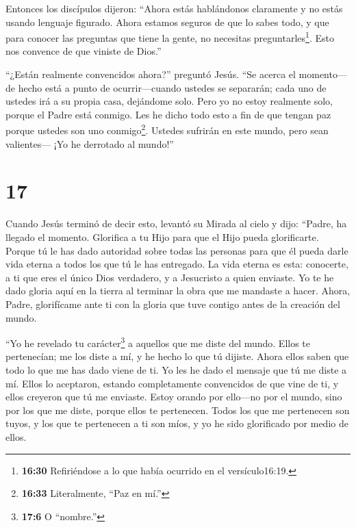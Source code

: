  Entonces los discípulos dijeron: ``Ahora estás hablándonos
claramente y no estás usando lenguaje figurado.  Ahora
estamos seguros de que lo sabes todo, y que para conocer las preguntas
que tiene la gente, no necesitas preguntarles\footnote{\textbf{16:30}
  Refiriéndose a lo que había ocurrido en el versículo16:19.}. Esto nos
convence de que viniste de Dios.''

 ``¿Están realmente convencidos ahora?'' preguntó Jesús.
 ``Se acerca el momento---de hecho está a punto de
ocurrir---cuando ustedes se separarán; cada uno de ustedes irá a su
propia casa, dejándome solo. Pero yo no estoy realmente solo, porque el
Padre está conmigo.  Les he dicho todo esto a fin de que
tengan paz porque ustedes son uno conmigo\footnote{\textbf{16:33}
  Literalmente, ``Paz en mí.''}. Ustedes sufrirán en este mundo, pero
sean valientes--- ¡Yo he derrotado al mundo!''

\hypertarget{section-16}{%
\section{17}\label{section-16}}

 Cuando Jesús terminó de decir esto, levantó su Mirada al
cielo y dijo: ``Padre, ha llegado el momento. Glorifica a tu Hijo para
que el Hijo pueda glorificarte.  Porque tú le has dado
autoridad sobre todas las personas para que él pueda darle vida eterna a
todos los que tú le has entregado.  La vida eterna es esta:
conocerte, a ti que eres el único Dios verdadero, y a Jesucristo a quien
enviaste.  Yo te he dado gloria aquí en la tierra al
terminar la obra que me mandaste a hacer.  Ahora, Padre,
glorifícame ante ti con la gloria que tuve contigo antes de la creación
del mundo.

 ``Yo he revelado tu carácter\footnote{\textbf{17:6} O
  ``nombre.''} a aquellos que me diste del mundo. Ellos te pertenecían;
me los diste a mí, y he hecho lo que tú dijiste.  Ahora
ellos saben que todo lo que me has dado viene de ti.  Yo les
he dado el mensaje que tú me diste a mí. Ellos lo aceptaron, estando
completamente convencidos de que vine de ti, y ellos creyeron que tú me
enviaste.  Estoy orando por ello---no por el mundo, sino por
los que me diste, porque ellos te pertenecen.  Todos los
que me pertenecen son tuyos, y los que te pertenecen a ti son míos, y yo
he sido glorificado por medio de ellos.

